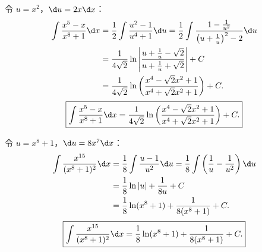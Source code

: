 \begin{solution}

    令 $u = x^2$，$\d u = 2x \d x$：
    \begin{equation}
        \begin{aligned}
            \int \frac{x^5 - x}{x^8 + 1} \d x & = \frac{1}{2}\int \frac{u^2 - 1}{u^4 + 1} \d u = \frac{1}{2}\int \frac{1 - \frac{1}{u^2}}{\left(u + \frac{1}{u}\right)^2 - 2} \d u \\
                                              & = \frac{1}{4\sqrt{2}}\ln\left| \frac{u + \frac{1}{u} - \sqrt{2}}{u + \frac{1}{u} + \sqrt{2}} \right| + C                           \\
                                              & = \frac{1}{4\sqrt{2}}\ln\left( \frac{x^4 - \sqrt{2}x^2 + 1}{x^4 + \sqrt{2}x^2 + 1} \right) + C.
        \end{aligned}
    \end{equation}
    \begin{equation}
        \boxed{\int \frac{x^5 - x}{x^8 + 1} \d x = \frac{1}{4\sqrt{2}}\ln\left( \frac{x^4 - \sqrt{2}x^2 + 1}{x^4 + \sqrt{2}x^2 + 1} \right) + C.}
    \end{equation}


    令 $u = x^8 + 1$，$\d u = 8x^7 \d x$：
    \begin{equation}
        \begin{aligned}
            \int \frac{x^{15}}{(x^8 + 1)^2} \d x & = \frac{1}{8}\int \frac{u - 1}{u^2} \d u = \frac{1}{8}\int \left( \frac{1}{u} - \frac{1}{u^2} \right) \d u \\
                                                 & = \frac{1}{8}\ln|u| + \frac{1}{8u} + C                                                                     \\
                                                 & = \frac{1}{8}\ln(x^8 + 1) + \frac{1}{8(x^8 + 1)} + C.
        \end{aligned}
    \end{equation}
    \begin{equation}
        \boxed{\int \frac{x^{15}}{(x^8 + 1)^2} \d x = \frac{1}{8}\ln(x^8 + 1) + \frac{1}{8(x^8 + 1)} + C.}
    \end{equation}
\end{solution}

